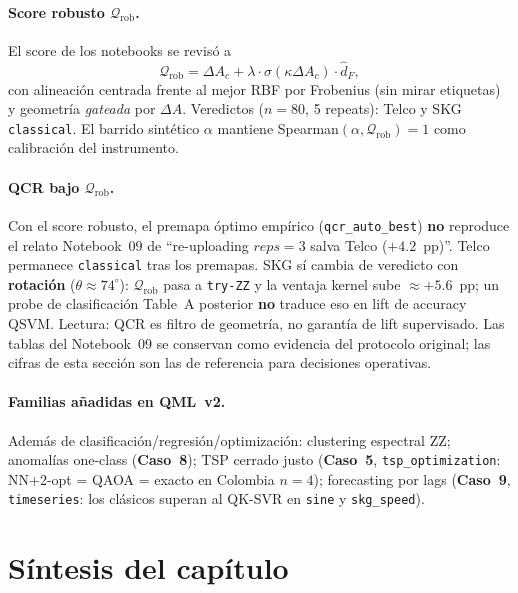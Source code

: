 \paragraph{Score robusto $\mathcal{Q}_{\mathrm{rob}}$.}
El score de los notebooks se revisó a
\[
\mathcal{Q}_{\mathrm{rob}}=\Delta A_c+\lambda\cdot\sigma(\kappa\Delta A_c)\cdot\hat d_F,
\]
con alineación centrada frente al mejor RBF por Frobenius (sin mirar etiquetas) y geometría \emph{gateada} por $\Delta A$. Veredictos ($n=80$, 5 repeats): Telco y SKG \texttt{classical}. El barrido sintético $\alpha$ mantiene Spearman$(\alpha,\mathcal{Q}_{\mathrm{rob}})=1$ como calibración del instrumento.

\paragraph{QCR bajo $\mathcal{Q}_{\mathrm{rob}}$.}
Con el score robusto, el premapa óptimo empírico (\texttt{qcr\_auto\_best}) \textbf{no} reproduce el relato Notebook~09 de ``re-uploading $reps=3$ salva Telco ($+4.2$~pp)''. Telco permanece \texttt{classical} tras los premapas. SKG sí cambia de veredicto con \textbf{rotación} ($\theta\approx 74^\circ$): $\mathcal{Q}_{\mathrm{rob}}$ pasa a \texttt{try-ZZ} y la ventaja kernel sube $\approx +5.6$~pp; un probe de clasificación Table~A posterior \textbf{no} traduce eso en lift de accuracy QSVM. Lectura: QCR es filtro de geometría, no garantía de lift supervisado. Las tablas del Notebook~09 se conservan como evidencia del protocolo original; las cifras de esta sección son las de referencia para decisiones operativas.

\paragraph{Familias añadidas en QML~v2.}
Además de clasificación/regresión/optimización: clustering espectral ZZ; anomalías one-class (\textbf{Caso~8}); TSP cerrado justo (\textbf{Caso~5}, \texttt{tsp\_optimization}: NN+2-opt = QAOA = exacto en Colombia $n=4$); forecasting por lags (\textbf{Caso~9}, \texttt{timeseries}: los clásicos superan al QK-SVR en \texttt{sine} y \texttt{skg\_speed}).

\section{Síntesis del capítulo}
\label{sec:sintesis_investigacion}

